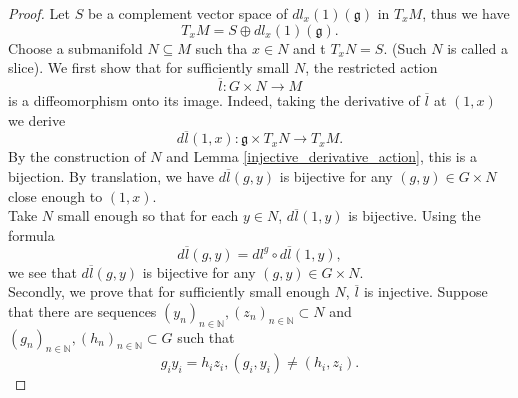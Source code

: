 \documentclass{article}
\numberwithin{equation}{section}
\begin{document}
\begin{proof}
Let $S$ be a complement vector space of $dl_x(1)(\mathfrak{g})$ in $T_xM$, thus we have%
\begin{equation*}
T_xM=S\oplus dl_x(1)(\mathfrak{g}).
\end{equation*}
Choose a submanifold $N\subseteq M$ such tha $x\in N$ and t $T_xN=S$. (Such $N$ is called a slice).%
We first show that for sufficiently small $N$, the restricted action
\begin{equation*}
\overline{l}:G\times N\to M
\end{equation*}
is a diffeomorphism onto its image. Indeed, taking the derivative of $\overline{l}$ at $(1,x)$ we derive
\begin{equation*}
d\overline{l}(1,x):\mathfrak{g}\times T_xN\to T_xM.
\end{equation*}
By the construction of $N$ and Lemma \ref{injective_derivative_action}, this is a bijection. By translation, we have $d\overline{l}(g,y)$ is bijective for any $(g,y)\in G\times N$ close enough to $(1,x)$. \\%
Take $N$ small enough so that for each $y\in N$, $d\overline{l}(1,y)$ is bijective. Using the formula
\begin{equation*}
d\overline{l}(g,y) = dl^g\circ d\overline{l}(1,y),
\end{equation*}
we see that $d\overline{l}(g,y)$ is bijective for any $(g,y)\in G\times N$.\\
Secondly, we prove that for sufficiently small enough $N$, $\overline{l}$ is injective. Suppose that there are sequences $(y_n)_{n\in\mathbb{N}}, (z_n)_{n\in\mathbb{N}}\subset N$ and $(g_n)_{n\in\mathbb{N}},(h_n)_{n\in\mathbb{N}}\subset G$ such that 
\begin{equation*}
g_iy_i = h_iz_i, (g_i,y_i)\not=(h_i,z_i).
\end{equation*}


\end{proof}
\end{document}

